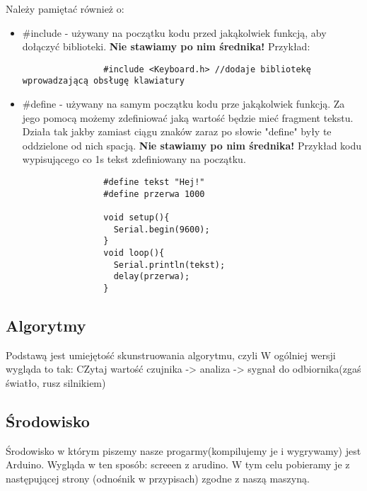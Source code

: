 	Należy pamiętać również o:
	\begin{itemize}
		\item #include - używany na początku kodu przed jakąkolwiek funkcją, aby dołączyć biblioteki. \textbf{Nie stawiamy po nim średnika!} Przykład:
			\begin{verbatim}
				#include <Keyboard.h> //dodaje bibliotekę wprowadzającą obsługę klawiatury
			\end{verbatim}
		\item #define - używany na samym początku kodu prze jakąkolwiek funkcją. Za jego pomocą możemy zdefiniować jaką wartość będzie mieć fragment tekstu.
		Działa tak jakby zamiast ciągu znaków zaraz po słowie "define" były te oddzielone od nich spacją. \textbf{Nie stawiamy po nim średnika!} Przykład kodu wypisującego co 1s tekst zdefiniowany na początku.
			\begin{verbatim}
				#define tekst "Hej!"
				#define przerwa 1000
				
				void setup(){
				  Serial.begin(9600);
				}
				void loop(){
				  Serial.println(tekst);
				  delay(przerwa);
				}
			\end{verbatim}
	\end{itemize}

	
%	  


	\subsection {Algorytmy}
	Podstawą jest umiejętość skunstruowania algorytmu, czyli 
W ogólniej wersji wygląda to tak:
CZytaj wartość czujnika -> analiza -> sygnał do odbiornika(zgaś światło, rusz silnikiem)
	\subsection{Środowisko}
		Środowisko w którym piszemy nasze progarmy(kompilujemy je i wygrywamy) jest Arduino. Wygląda w ten sposób: screeen z arudino. 
W tym celu pobieramy je z następującej strony (odnośnik w przypisach) zgodne z naszą maszyną.

